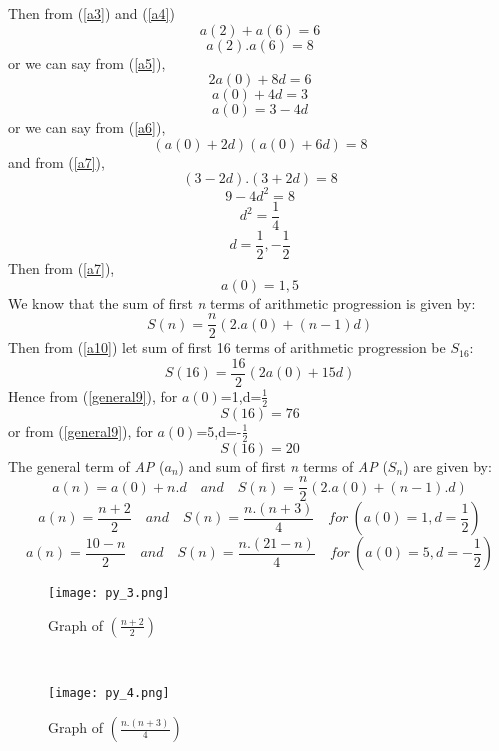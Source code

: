 \documentclass{article}
\begin{document}
Then from (\ref{a3}) and (\ref{a4})
\begin{equation}
\label{a5}
a(2)+a(6)=6
\end{equation}
\begin{equation}
\label{a6}
a(2).a(6)=8
\end{equation}
or we can say from (\ref{a5}),
\[2a(0)+8d=6\]
\[a(0)+4d=3\]
\begin{equation}
\label{a7}
a(0)=3-4d
\end{equation}
or we can say from (\ref{a6}),
$$(a(0)+2d)(a(0)+6d)=8$$
and from (\ref{a7}),
\[(3-2d).(3+2d)=8\]
\[9-4d^2=8\]
\[d^2=\frac{1}{4}\]
\begin{equation}
\label{a8}
d=\frac{1}{2},-\frac{1}{2}
\end{equation}
Then from (\ref{a7}),
\begin{equation}
\label{a9}
a(0)=1,5
\end{equation}
We know that the sum of first \textit{n} terms of arithmetic progression is given by:
\begin{equation}
\label{a10}
S(n)= \frac{n}{2}(2.a(0)+(n-1)d)
\end{equation}
Then from (\ref{a10}) let sum of first 16 terms of arithmetic progression be $S_{16}$:
\begin{equation}
\label{general9}
S(16)= \frac{16}{2}(2a(0)+15d)
\end{equation}
Hence from (\ref{general9}),
for $a(0)$=1,d=$\frac{1}{2}$
$$S(16)=76$$
or from (\ref{general9}),
for $a(0)$=5,d=-$\frac{1}{2}$
$$S(16)=20$$
The general term of \textit{AP} ($a_n$) and sum of first \textit{n} terms of \textit{AP} ($S_n$) are given by:
$$a(n)=a(0)+n.d\quad and\quad S(n)=\frac{n}{2}(2.a(0)+(n-1).d)$$
$$a(n)=\frac{n+2}{2}\quad and\quad S(n)=\frac{n.(n+3)}{4}\quad for\ (a(0)=1,d=\frac{1}{2})$$
$$a(n)=\frac{10-n}{2}\quad and\quad S(n)=\frac{n.(21-n)}{4}\quad for\ (a(0)=5,d=-\frac{1}{2})$$
\begin{figure}
    \centering
    \texttt{[image: py\_3.png]}
    \caption{Graph of $\left(\frac{n+2}{2}\right)$}
    \label{fig:enter-label}
\end{figure}\\
\begin{figure}
    \centering
    \texttt{[image: py\_4.png]}
    \caption{Graph of $\left(\frac{n.(n+3)}{4}\right)$}
    \label{fig:enter-label}
\end{figure}\\
\end{document}
